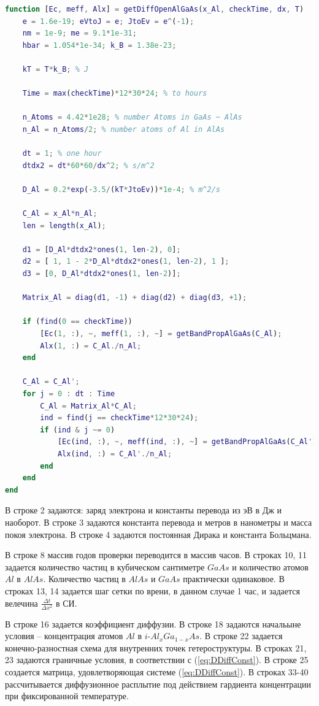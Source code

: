 \begin{lstlisting}[style=realcode,language=Matlab,caption={Функция расчета диффузионного расплытия атомов $Al$ в <<открытой>> системе $i$-$Al_{x}Ga_{1-x}As$},label={lst:OD}]
function [Ec, meff, Alx] = getDiffOpenAlGaAs(x_Al, checkTime, dx, T)
	e = 1.6e-19; eVtoJ = e; JtoEv = e^(-1);
	nm = 1e-9; me = 9.1*1e-31;
	hbar = 1.054*1e-34; k_B = 1.38e-23;

	kT = T*k_B; % J
	
	Time = max(checkTime)*12*30*24; % to hours
	
	n_Atoms = 4.42*1e28; % number Atoms in GaAs ~ AlAs
	n_Al = n_Atoms/2; % number atoms of Al in AlAs

	dt = 1; % one hour
	dtdx2 = dt*60*60/dx^2; % s/m^2

	D_Al = 0.2*exp(-3.5/(kT*JtoEv))*1e-4; % m^2/s

	C_Al = x_Al*n_Al;
	len = length(x_Al);

	d1 = [D_Al*dtdx2*ones(1, len-2), 0];
	d2 = [ 1, 1 - 2*D_Al*dtdx2*ones(1, len-2), 1 ];
	d3 = [0, D_Al*dtdx2*ones(1, len-2)];
	
	Matrix_Al = diag(d1, -1) + diag(d2) + diag(d3, +1);

	if (find(0 == checkTime))
		[Ec(1, :), ~, meff(1, :), ~] = getBandPropAlGaAs(C_Al);
		Alx(1, :) = C_Al./n_Al;		
	end

	C_Al = C_Al';
	for j = 0 : dt : Time
		C_Al = Matrix_Al*C_Al;
		ind = find(j == checkTime*12*30*24); 
		if (ind & j ~= 0)
			[Ec(ind, :), ~, meff(ind, :), ~] = getBandPropAlGaAs(C_Al');
			Alx(ind, :) = C_Al'./n_Al;
		end
	end
end
\end{lstlisting}
В строке 2 задаются: заряд электрона и константы перевода из эВ в Дж и наоборот. В строке 3 задаются константа перевода и метров в нанометры и масса покоя электрона. В строке 4 задаются постоянная Дирака и константа Больцмана.

В строке 8 массив годов проверки переводится в массив часов. В строках 10, 11 задается количество частиц в кубическом сантиметре $GaAs$ и количество атомов $Al$ в $AlAs$. Количество частиц в $AlAs$ и $GaAs$ практически одинаковое. В строках 13, 14 задается шаг сетки по врени, в данном случае 1 час, и задается велечина $\frac{\Delta t}{\Delta x^{2}}$ в СИ.

В строке 16 задается коэффициент диффузии. В строке 18 задаются начальыне условия -- концентрация атомов $Al$ в $i$-$Al_{x}Ga_{1-x}As$. В строке 22 задается конечно-разностная схема для внутренних точек гетероструктуры. В строках 21, 23 задаются граничные условия, в соответствии с (\ref{eq:DDiffConst}). В строке 25 создается матрица, удовлетворяющая системе (\ref{eq:DDiffConst}). В строках 33-40 рассчитывается диффузионное расплытие под действием гардиента концентрации при фиксированной температуре.

